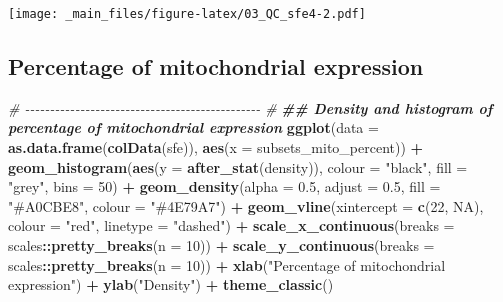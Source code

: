 \documentclass[
]{book}
\newenvironment{Shaded}{\begin{snugshade}}{\end{snugshade}}
\newcommand{\AttributeTok}[1]{\textcolor[rgb]{0.13,0.29,0.53}{#1}}
\newcommand{\CommentTok}[1]{\textcolor[rgb]{0.56,0.35,0.01}{\textit{#1}}}
\newcommand{\ConstantTok}[1]{\textcolor[rgb]{0.56,0.35,0.01}{#1}}
\newcommand{\DecValTok}[1]{\textcolor[rgb]{0.00,0.00,0.81}{#1}}
\newcommand{\DocumentationTok}[1]{\textcolor[rgb]{0.56,0.35,0.01}{\textbf{\textit{#1}}}}
\newcommand{\FloatTok}[1]{\textcolor[rgb]{0.00,0.00,0.81}{#1}}
\newcommand{\FunctionTok}[1]{\textcolor[rgb]{0.13,0.29,0.53}{\textbf{#1}}}
\newcommand{\NormalTok}[1]{#1}
\newcommand{\SpecialCharTok}[1]{\textcolor[rgb]{0.81,0.36,0.00}{\textbf{#1}}}
\newcommand{\StringTok}[1]{\textcolor[rgb]{0.31,0.60,0.02}{#1}}
\begin{document}
\texttt{[image: \_main\_files/figure-latex/03\_QC\_sfe4-2.pdf]}

\hypertarget{percentage-of-mitochondrial-expression-1}{%
\subsection{Percentage of mitochondrial expression}\label{percentage-of-mitochondrial-expression-1}}

\begin{Shaded}
\begin{Highlighting}[]
\CommentTok{\# {-}{-}{-}{-}{-}{-}{-}{-}{-}{-}{-}{-}{-}{-}{-}{-}{-}{-}{-}{-}{-}{-}{-}{-}{-}{-}{-}{-}{-}{-}{-}{-}{-}{-}{-}{-}{-}{-}{-}{-}{-}{-}{-}{-}{-}{-}{-} \#}
\DocumentationTok{\#\# Density and histogram of percentage of mitochondrial expression}
\FunctionTok{ggplot}\NormalTok{(}\AttributeTok{data =} \FunctionTok{as.data.frame}\NormalTok{(}\FunctionTok{colData}\NormalTok{(sfe)),}
       \FunctionTok{aes}\NormalTok{(}\AttributeTok{x =}\NormalTok{ subsets\_mito\_percent)) }\SpecialCharTok{+}
    \FunctionTok{geom\_histogram}\NormalTok{(}\FunctionTok{aes}\NormalTok{(}\AttributeTok{y =} \FunctionTok{after\_stat}\NormalTok{(density)), }
                   \AttributeTok{colour =} \StringTok{"black"}\NormalTok{, }
                   \AttributeTok{fill =} \StringTok{"grey"}\NormalTok{,}
                   \AttributeTok{bins =} \DecValTok{50}\NormalTok{) }\SpecialCharTok{+}
    \FunctionTok{geom\_density}\NormalTok{(}\AttributeTok{alpha =} \FloatTok{0.5}\NormalTok{,}
                 \AttributeTok{adjust =} \FloatTok{0.5}\NormalTok{,}
                 \AttributeTok{fill =} \StringTok{"\#A0CBE8"}\NormalTok{,}
                 \AttributeTok{colour =} \StringTok{"\#4E79A7"}\NormalTok{) }\SpecialCharTok{+} 
    \FunctionTok{geom\_vline}\NormalTok{(}\AttributeTok{xintercept =} \FunctionTok{c}\NormalTok{(}\DecValTok{22}\NormalTok{, }\ConstantTok{NA}\NormalTok{),}
               \AttributeTok{colour =} \StringTok{"red"}\NormalTok{, }
               \AttributeTok{linetype =} \StringTok{"dashed"}\NormalTok{) }\SpecialCharTok{+}
    \FunctionTok{scale\_x\_continuous}\NormalTok{(}\AttributeTok{breaks =}\NormalTok{ scales}\SpecialCharTok{::}\FunctionTok{pretty\_breaks}\NormalTok{(}\AttributeTok{n =} \DecValTok{10}\NormalTok{)) }\SpecialCharTok{+} 
    \FunctionTok{scale\_y\_continuous}\NormalTok{(}\AttributeTok{breaks =}\NormalTok{ scales}\SpecialCharTok{::}\FunctionTok{pretty\_breaks}\NormalTok{(}\AttributeTok{n =} \DecValTok{10}\NormalTok{)) }\SpecialCharTok{+} 
    \FunctionTok{xlab}\NormalTok{(}\StringTok{"Percentage of mitochondrial expression"}\NormalTok{) }\SpecialCharTok{+} 
    \FunctionTok{ylab}\NormalTok{(}\StringTok{"Density"}\NormalTok{) }\SpecialCharTok{+} 
    \FunctionTok{theme\_classic}\NormalTok{()}
\end{Highlighting}
\end{Shaded}
\end{document}
